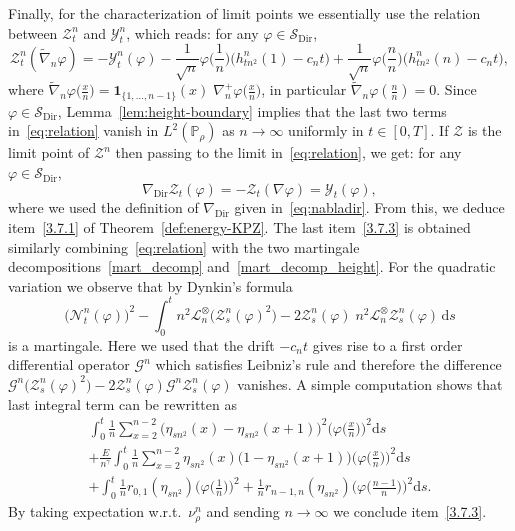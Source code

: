 \documentclass[AHL,Unicode,longabstracts]{cedram}
\DeclareMathOperator{\Dir}{Dir}
\newcommand{\bb}[1]{{\mathbb #1}}
\newcommand{\mc}[1]{{\mathcal #1}}
\renewcommand{\mc}[1]{{\mathcal #1}}
\newcommand{\SD}{\ensuremath{\mc S_{\Dir}}}
\renewcommand{\tilde}{\widetilde}
\newcommand*{\dd}{\mathrm{d}}
\newcommand*{\ds}{\dd s}
\renewcommand{\tfrac}{\frac}
\begin{document}
Finally, for the characterization of limit points we essentially use the relation between $\mc Z_t^n$ and $\mc Y_t^n$, which reads: for any $\varphi \in \SD$,
\begin{equation}\label{eq:relation}
\mc Z_t^n(\tilde\nabla_n\varphi) = -\mc Y_t^n(\varphi) - \frac{1}{\sqrt n}\varphi\Big(\frac1n\Big) \big(h_{tn^2}^n(1)-c_nt\big) + \frac{1}{\sqrt n}\varphi\Big(\frac n n\Big)\big(h_{tn^2}^n(n)-c_nt\big),
\end{equation}
where $\tilde\nabla_n\varphi(\frac x n\big)=\mathbf{1}_{\{1,\dots,n-1\}}(x)\;\nabla_n^+\varphi(\frac x n\big)$, in particular $\tilde\nabla_n\varphi(\frac n n)=0$. Since $\varphi \in \SD$, Lemma~\ref{lem:height-boundary} implies that the last two terms in~\eqref{eq:relation} vanish in $L^2(\bb P_\rho)$ as $n\to\infty$ uniformly in $t\in[0,T]$. If $\mc Z$ is the limit point of $\mc Z^n$ then passing to the limit in~\eqref{eq:relation}, we get: for any $\varphi \in \SD$,
\[
\nabla_{\Dir}\mc Z_t(\varphi) = - \mc Z_t(\nabla \varphi) = \mc Y_t(\varphi),
\]
where we used the definition of $\nabla_{\Dir}$ given in~\eqref{eq:nabladir}. From this, we deduce item~\eqref{3.7.1} of Theorem~\ref{def:energy-KPZ}. The last item~\eqref{3.7.3} is obtained similarly combining~\eqref{eq:relation} with the two martingale decompositions~\eqref{mart_decomp} and~\eqref{mart_decomp_height}. For the quadratic variation we observe that by Dynkin's formula
\begin{equation*}
\Big(\mc N_t^n(\varphi)\Big)^2-\int_0^t n^2\mc L_n^\otimes\big(\mc Z^n_s(\varphi)^2\big)-2\mc Z^n_s(\varphi)\; n^2\mc L_n^\otimes \mc Z^n_s(\varphi) \,\ds
\end{equation*}
is a martingale. Here we used that the drift $-c_n t$ gives rise to a first order differential operator $\mc G^n$ which satisfies Leibniz's rule and therefore the difference $\mc G^n\big(\mc Z^n_s(\varphi)^2\big)-2\mc Z^n_s(\varphi) \mc G^n \mc Z^n_s(\varphi) $ vanishes. A simple computation shows that last integral term can be rewritten as
\begin{multline*}
\int_0^t\frac{1}{n}\sum_{x=2}^{n-2} \big(\eta_{sn^2}(x)-\eta_{sn^2}(x+1)\big)^2 \Big(\varphi\Big(\tfrac{x}{n}\Big)\Big)^2\ds\\
+ \frac{E}{n^\gamma}\int_0^t \frac{1}{n} \sum_{x=2}^{n-2} \eta_{sn^2}(x)\big(1-\eta_{sn^2}(x+1)\big) \Big(\varphi\Big(\tfrac{x}{n}\Big)\Big)^2\ds\\
+ \int_0^t\frac{1}{n} r_{0,1}(\eta_{sn^2}) \Big(\varphi\Big(\tfrac{1}{n}\Big)\Big)^2+\frac{1}{n} r_{n-1,n}(\eta_{sn^2}) \Big(\varphi\Big(\tfrac{n-1}{n}\Big)\Big)^2\ds.
\end{multline*}
By taking expectation w.r.t.~$\nu_\rho^n$ and sending $n\to\infty$ we conclude item~\eqref{3.7.3}.
\end{document}

